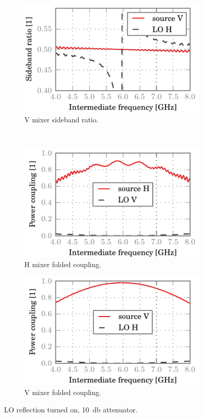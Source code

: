 \begin{figure}[hbtp]
    \begin{subfigure}[b]{.5\textwidth}
        \includegraphics{chapter_3/13_lor_att10_v_sbr}%
        \caption{V mixer sideband ratio.}
    \end{subfigure}%
    \\
    \begin{subfigure}[b]{.5\textwidth}
        \includegraphics{chapter_3/13_lor_att10_h_ssb}%
        \caption{H mixer folded coupling.}
    \end{subfigure}%
    \begin{subfigure}[b]{.5\textwidth}
        \includegraphics{chapter_3/13_lor_att10_v_ssb}%
        \caption{V mixer folded coupling.}
    \end{subfigure}%
    \caption{LO reflection turned on, \SI{10}{\decibel} attenuator.}
    \label{fig:13_lor_att10}
\end{figure}

